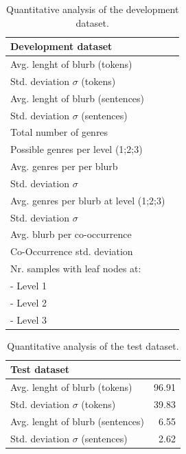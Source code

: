 \documentclass[11pt,a4paper]{article}
\begin{document}
\begin{table}
\small
\begin{center}
\begin{tabular}{|l|r|}
\hline\centering\textbf{Development dataset}  &                    \\
\hline
Avg. lenght of blurb (tokens)              &               \\
Std. deviation $\sigma$ (tokens)           &               \\
Avg. lenght of blurb (sentences)           &                \\
Std. deviation $\sigma$ (sentences)        &                \\
\hline
Total number of genres                     &                 \\
Possible genres per level (1;2;3)          &          \\
Avg. genres per per blurb                  &                 \\
Std. deviation $\sigma$                    &                \\
Avg. genres per blurb at level (1;2;3)     &    \\
Std. deviation $\sigma$                    &    \\
\hline
Avg. blurb per co-occurrence               &                \\
Co-Occurrence std. deviation               &               \\
\hline
Nr. samples with leaf nodes at:            &                    \\
 - Level 1                                 &         \\
 - Level 2                                 &      \\
 - Level 3                                 &      \\
\hline
\end{tabular}
\end{center}
\caption{\label{quantitivy-analysis-train}Quantitative analysis of the development dataset.}
\end{table}








\begin{table}
\begin{center}
\begin{tabular}{|l|r|}
\hline\centering\textbf{Test dataset}  &         \\
\hline
Avg. lenght of blurb (tokens)              &  96.91             \\
Std. deviation $\sigma$ (tokens)           &  39.83             \\
Avg. lenght of blurb (sentences)           &  6.55              \\
Std. deviation $\sigma$ (sentences)        &  2.62              \\
\hline
\end{tabular}
\end{center}
\caption{\label{quantitivy-analysis-dev}Quantitative analysis of the test dataset.}
\end{table}
\end{document}

